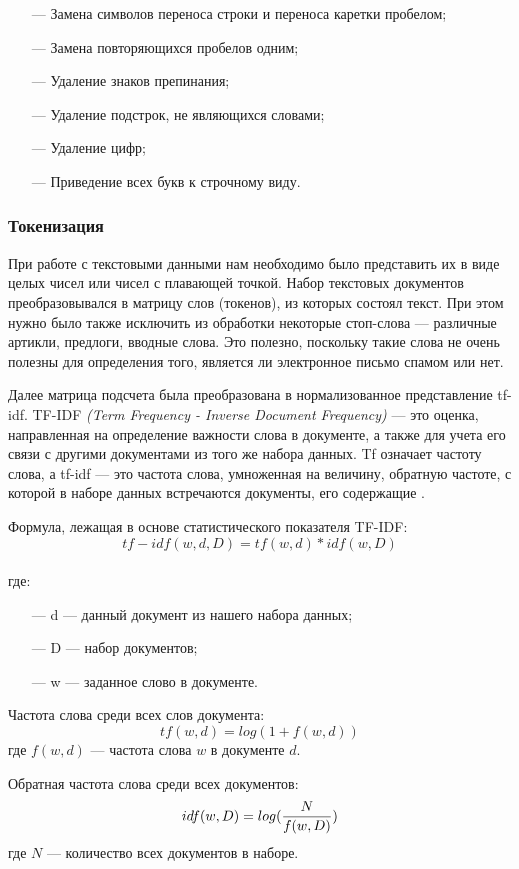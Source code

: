 \begin{itemize}
    \item[—] Замена символов переноса строки и переноса каретки пробелом;
    \item[—] Замена повторяющихся пробелов одним;
    \item[—] Удаление знаков препинания;
    \item[—] Удаление подстрок, не являющихся словами;
    \item[—] Удаление цифр;
    \item[—] Приведение всех букв к строчному виду.
\end{itemize}

\subsubsection{Токенизация}

При работе с текстовыми данными нам необходимо было представить их в виде целых чисел или чисел с плавающей точкой.
Набор текстовых документов преобразовывался в матрицу слов (токенов), из которых состоял текст. При этом нужно было также
исключить из обработки некоторые стоп-слова — различные артикли, предлоги, вводные слова. Это полезно,
поскольку такие слова не очень полезны для определения того, является ли электронное письмо спамом или нет.

Далее матрица подсчета была преобразована в нормализованное представление tf-idf. 
TF-IDF \emph{(Term Frequency - Inverse Document Frequency)} — это оценка, направленная на определение важности слова
в документе, а также для учета его связи с другими документами из того же набора данных. Tf 
означает частоту слова, а tf-idf — это частота слова, умноженная на величину, обратную частоте,
с которой в наборе данных встречаются документы, его содержащие \cite{Manning}.

Формула, лежащая в основе статистического показателя TF-IDF:
\begin{equation}\label{eq15}
    tf-idf(w, d, D) = tf(w, d) * idf(w, D)
\end{equation}
\\
где:

\begin{itemize}
    \item[—] d — данный документ из нашего набора данных;
    \item[—] D — набор документов;
    \item[—] w — заданное слово в документе.
\end{itemize}

Частота слова среди всех слов документа:
\begin{equation}\label{eq16}
    tf(w, d) = log(1 + f(w, d))
\end{equation}
где $f(w, d)$ — частота слова $w$ в документе $d$.

Обратная частота слова среди всех документов:
\begin{equation}\label{eq17}
    idf(w, D) = log({{N}\over{f(w, D)}})
\end{equation}
где $N$ — количество всех документов в наборе.
